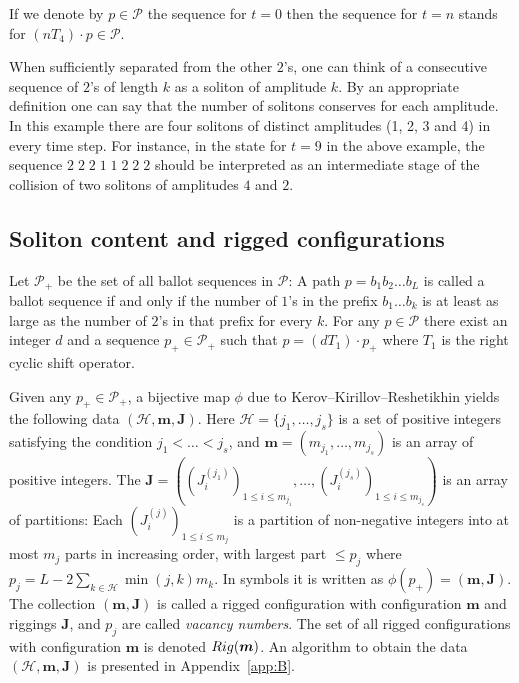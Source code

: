 \documentclass[11pt]{article}
\newcommand{\Rig}{{\rm Rig}}
\newcommand{\Pth}{{\mathcal P}}
\newcommand{\m}{{\boldsymbol m}}
\newcommand{\boJ}{{\boldsymbol J}}
\renewcommand{\H}{{\mathcal H}}
\begin{document}
If we denote by $p \in {\mathcal P}$ the sequence for $t=0$ then the sequence for $t=n$ stands for
$(n T_4) \cdot p \in {\mathcal P}$.

When suf\/f\/iciently separated from the other $2$'s, one can think of
a consecutive sequence of $2$'s of length $k$ as a soliton of amplitude $k$.
By an appropriate def\/inition one can say that the number of solitons conserves for each amplitude.
In this example there are four solitons of distinct amplitudes (1, 2, 3 and 4) in every time step.
For instance, in the state for $t=9$ in the above example, the sequence $2\; 2\; 2\; 1\; 1\; 2\; 2\; 2$ should be interpreted as
an intermediate stage of the collision of two solitons of amplitudes $4$ and $2$.


\subsection{Soliton content and rigged conf\/igurations}\label{subsec:4_2}

Let
$\Pth_+$ be the set of all ballot sequences in $\Pth $: A path $p = b_1 b_2 \ldots b_L$ is called a ballot sequence if and only if
the number of $1$'s in the pref\/ix $b_1 \ldots b_k$ is at least as large as the number of $2$'s in that pref\/ix
for every $k$.
%
For any $p \in {\mathcal P}$ there exist an integer $d$ and a sequence $p_+ \in \Pth_+$ such that $p = (d T_1) \cdot p_+$
where $T_1$ is the right cyclic shift operator.

Given any $p_+ \in \Pth_+$, a bijective map $\phi$
due to Kerov--Kirillov--Reshetikhin \cite{KKR,KR}
yields the following data
$(\H, \m, \boJ)$.
Here $\H=\{ j_1,  \ldots ,j_s \}$ is a set of positive integers
satisfying the condition $j_1 < \dots < j_s$, and
$\m=( m_{j_1},\ldots,m_{j_s} )$ is an array of positive integers.
The
$\boJ = \left((J^{(j_1)}_i)_{1 \le i \le m_{j_1}}, \ldots,
(J^{(j_s)}_i)_{1 \le i \le m_{j_s}}\right)$
is an array of partitions:
Each $(J^{(j)}_i)_{1 \le i \le m_{j}}$ is a partition of non-negative integers into at most $m_j$ parts
in increasing order,
with largest part $\le p_j$
where
\begin{math}%
p_j = L - 2\sum_{k \in \H}\min(j,k)m_k.
\end{math}
In symbols it is written as $\phi (p_+) = (\m,\boJ)$.
The collection $(\m,\boJ)$ is called a rigged conf\/iguration with conf\/iguration $\m$ and
riggings $\boJ$, and $p_j$ are called \textit{vacancy numbers}.
The set of all rigged conf\/igurations with conf\/iguration $\m$ is denoted $\Rig(\m)$.
An algorithm to obtain the data
$(\H, \m, \boJ)$ is presented in Appendix~\ref{app:B}.
\end{document}
